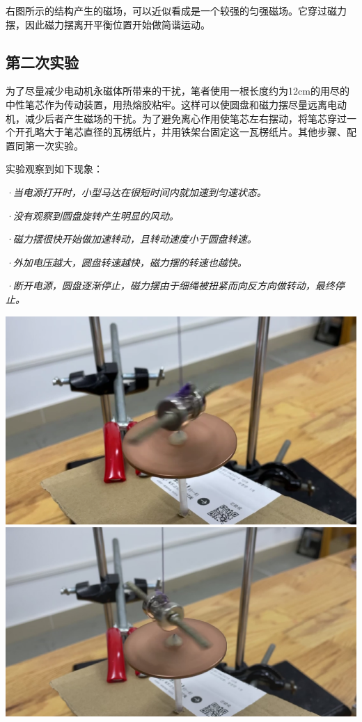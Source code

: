 \documentclass{CLGPY}
\begin{document}
\begin{multicols}{1}
右图所示的结构产生的磁场，可以近似看成是一个较强的匀强磁场。它穿过磁力摆，因此磁力摆离开平衡位置开始做简谐运动。
\subsection{第二次实验}
为了尽量减少电动机永磁体所带来的干扰，笔者使用一根长度约为12cm的用尽的中性笔芯作为传动装置，用热熔胶粘牢。这样可以使圆盘和磁力摆尽量远离电动机，减少后者产生磁场的干扰。为了避免离心作用使笔芯左右摆动，将笔芯穿过一个开孔略大于笔芯直径的瓦楞纸片，并用铁架台固定这一瓦楞纸片。其他步骤、配置同第一次实验。

实验观察到如下现象：

\emph{·当电源打开时，小型马达在很短时间内就加速到匀速状态。}

\emph{·没有观察到圆盘旋转产生明显的风动。}

\emph{·磁力摆很快开始做加速转动，且转动速度小于圆盘转速。}

\emph{·外加电压越大，圆盘转速越快，磁力摆的转速也越快。}

\emph{·断开电源，圆盘逐渐停止，磁力摆由于细绳被扭紧而向反方向做转动，最终停止。}

        \begin{center}
            \includegraphics[scale=.3]{./fig/20210617225410.png}\\[4pt]
            \includegraphics[scale=.152]{./fig/20210619000939.png}
        \end{center}


\end{multicols}
\end{document}
